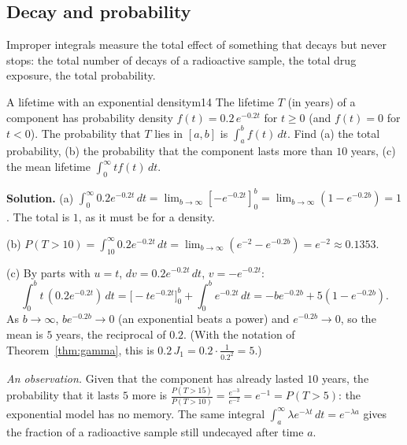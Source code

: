 \documentclass[11pt]{article}
\begin{document}
\subsection*{Decay and probability}

Improper integrals measure the total effect of something that decays but never stops: the total number of decays of a radioactive sample, the total drug exposure, the total probability.

\begin{exmp}{A lifetime with an exponential density}{m14}
The lifetime $T$ (in years) of a component has probability density $f(t)=0.2\,e^{-0.2t}$ for $t\ge0$ (and $f(t)=0$ for $t<0$). The probability that $T$ lies in $[a,b]$ is $\int_a^bf(t)\,dt$. Find (a) the total probability, (b) the probability that the component lasts more than $10$ years, (c) the mean lifetime $\int_0^\infty tf(t)\,dt$.

\textbf{Solution.} (a) $\int_0^\infty0.2e^{-0.2t}\,dt=\lim_{b\to\infty}\left[-e^{-0.2t}\right]_0^b=\lim_{b\to\infty}\left(1-e^{-0.2b}\right)=1$. The total is $1$, as it must be for a density.

(b) $P(T>10)=\int_{10}^\infty0.2e^{-0.2t}\,dt=\lim_{b\to\infty}\left(e^{-2}-e^{-0.2b}\right)=e^{-2}\approx0.1353$.

(c) By parts with $u=t$, $dv=0.2e^{-0.2t}\,dt$, $v=-e^{-0.2t}$:
\[\int_0^bt\,(0.2e^{-0.2t})\,dt=\Big[-te^{-0.2t}\Big]_0^b+\int_0^be^{-0.2t}\,dt=-be^{-0.2b}+5\left(1-e^{-0.2b}\right).\]
As $b\to\infty$, $be^{-0.2b}\to0$ (an exponential beats a power) and $e^{-0.2b}\to0$, so the mean is $5$ years, the reciprocal of $0.2$. (With the notation of Theorem~\ref{thm:gamma}, this is $0.2\,J_1=0.2\cdot\frac1{0.2^2}=5$.)

\emph{An observation.} Given that the component has already lasted $10$ years, the probability that it lasts $5$ more is $\frac{P(T>15)}{P(T>10)}=\frac{e^{-3}}{e^{-2}}=e^{-1}=P(T>5)$: the exponential model has no memory. The same integral $\int_a^\infty\lambda e^{-\lambda t}\,dt=e^{-\lambda a}$ gives the fraction of a radioactive sample still undecayed after time $a$.


\end{exmp}
\end{document}
